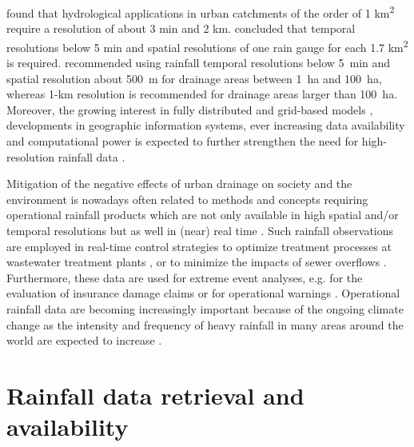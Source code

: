 \documentclass{ctuthesis}\usepackage[]{graphicx}\usepackage[]{color}
\begin{document}
\cite{berneTemporalSpatialResolution2004} found that hydrological applications in urban catchments of the order of 1 km\textsuperscript{2} require a resolution of about 3 min and 2 km. \cite{notaroImpactRainfallData2013} concluded that temporal resolutions below 5 min and spatial resolutions of one rain gauge for each 1.7 km\textsuperscript{2} is required.  \cite{ochoa-rodriguezImpactSpatialTemporal2015} recommended using rainfall temporal resolutions below 5~min and spatial resolution about 500~m for drainage areas between 1~ha and 100~ha, whereas 1-km resolution is recommended  for drainage areas larger than 100~ha. Moreover, the growing interest in fully distributed and grid-based models \citep{ochoa-rodriguezImpactSpatialTemporal2015, ichibaScaleEffectChallenges2018}, developments in geographic information systems, ever increasing data availability and computational power is expected to further strengthen the need for high-resolution rainfall data \citep{ochoa-rodriguezReviewRadarRain2019, salvadoreHydrologicalModellingUrbanized2015}. 

Mitigation of the negative effects of urban drainage on society and the environment is nowadays often related to methods and concepts requiring operational rainfall products which are not only available in  high spatial and/or temporal resolutions but as well in (near) real time \citep{einfaltRoadmapUseRadar2004}. Such rainfall observations are employed in real-time control strategies to optimize treatment processes at wastewater treatment plants \citep{schutzeRealTimeControl2004}, or to minimize the impacts of sewer overflows \citep{vezzaroGeneralisedDynamicOverflow2014}. Furthermore, these data are used for extreme event analyses, e.g. for the evaluation of insurance damage claims \citep{spekkersStatisticalAnalysisInsurance2013} or for operational warnings \citep{montesarchioRainfallThresholdsFlood2009}. Operational rainfall data are becoming increasingly important because of the ongoing climate change \citep{vanderpolImpactsRainfallVariability2015} as the intensity and frequency of heavy rainfall in many areas around the world are expected to increase \citep{willemsClimateChangeImpact2012}.


\section{Rainfall data retrieval and availability}
\end{document}
